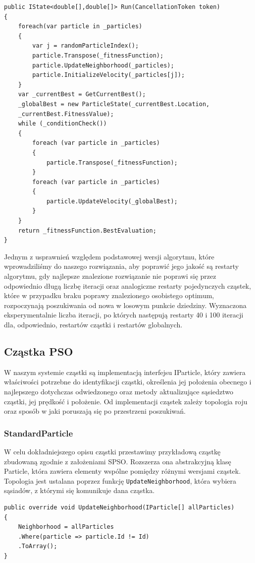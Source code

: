 \documentclass[12pt, twoside, openany, abstract=on]{report}
\theoremstyle{definition}
\begin{document}
\lstset{style=sharpc}
\begin{lstlisting}[frame=single]
public IState<double[],double[]> Run(CancellationToken token)
{
	foreach(var particle in _particles)
	{
		var j = randomParticleIndex();	      
		particle.Transpose(_fitnessFunction);
	    particle.UpdateNeighborhood(_particles);
		particle.InitializeVelocity(_particles[j]);
	}
	var _currentBest = GetCurrentBest();
	_globalBest = new ParticleState(_currentBest.Location,
	_currentBest.FitnessValue);
	while (_conditionCheck())
	{
		foreach (var particle in _particles)
		{
	    	particle.Transpose(_fitnessFunction);
	    }
		foreach (var particle in _particles)
	    {
			particle.UpdateVelocity(_globalBest);
		}
	}
	return _fitnessFunction.BestEvaluation;
}
\end{lstlisting}

Jednym z usprawnień względem podstawowej wersji algorytmu, które wprowadziliśmy do naszego rozwiązania, aby poprawić jego jakość są restarty algorytmu, gdy najlepsze znalezione rozwiązanie nie poprawi się przez odpowiednio długą liczbę iteracji oraz analogiczne restarty pojedynczych cząstek, które w przypadku braku poprawy znalezionego osobistego optimum, rozpoczynają poszukiwania od nowa w losowym punkcie dziedziny. Wyznaczona eksperymentalnie liczba iteracji, po których następują restarty 40 i 100 iteracji dla, odpowiednio, restartów cząstki i restartów globalnych.

\subsection{Cząstka PSO}
W naszym systemie cząstki są implementacją interfejsu IParticle, który zawiera właściwości potrzebne do identyfikacji cząstki, określenia jej położenia obecnego i najlepszego dotychczas odwiedzonego oraz metody   aktualizujące sąsiedztwo cząstki, jej prędkość i położenie. Od implementacji cząstek zależy topologia roju oraz sposób w jaki poruszają się po przestrzeni poszukiwań. 

\subsubsection{StandardParticle}
W celu dokładniejszego opisu cząstki przestawimy przykładową cząstkę zbudowaną zgodnie z założeniami SPSO. %
Rozszerza ona abstrakcyjną klasę Particle, która zawiera elementy wspólne pomiędzy różnymi wersjami cząstek. Topologia jest ustalana poprzez funkcję \texttt{UpdateNeighborhood}, która wybiera sąsiadów, z którymi się komunikuje dana cząstka.
\lstset{style=sharpc}
\begin{lstlisting}[frame=single]
public override void UpdateNeighborhood(IParticle[] allParticles)
{
	Neighborhood = allParticles
	.Where(particle => particle.Id != Id)
	.ToArray();
}
\end{lstlisting}
\end{document}
